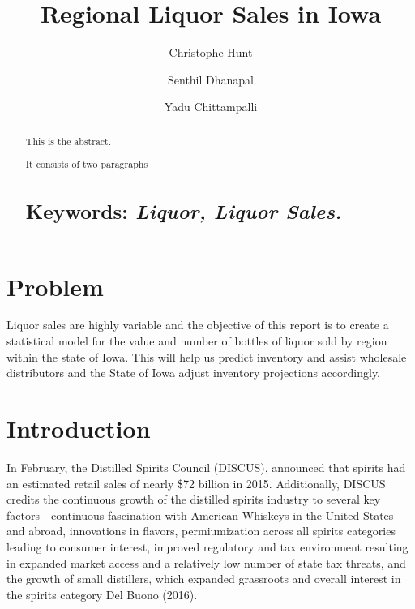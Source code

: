 \documentclass[]{elsarticle} %
\begin{document}
\begin{frontmatter}

  \title{Regional Liquor Sales in Iowa}
    \author[CUNY School of Professional Studies]{Christophe Hunt}
    \author[CUNY School of Professional Studies]{Senthil Dhanapal}
  
    \author[CUNY School of Professional Studies]{Yadu Chittampalli}
  
      \address[CUNY School of Professional Studies]{CUNY School of Professional Studies, Data Analytics, New York, NY}
  
  \begin{abstract}
  This is the abstract.
  
  It consists of two paragraphs
  
  \section{\texorpdfstring{Keywords: \emph{Liquor, Liquor
  Sales.}}{Keywords: Liquor, Liquor Sales.}}\label{keywords-liquor-liquor-sales.}
  \end{abstract}
  
 \end{frontmatter}

\section{Problem}\label{problem}

Liquor sales are highly variable and the objective of this report is to
create a statistical model for the value and number of bottles of liquor
sold by region within the state of Iowa. This will help us predict
inventory and assist wholesale distributors and the State of Iowa adjust
inventory projections accordingly.

\section{Introduction}\label{introduction}

In February, the Distilled Spirits Council (DISCUS), announced that
spirits had an estimated retail sales of nearly \$72 billion in 2015.
Additionally, DISCUS credits the continuous growth of the distilled
spirits industry to several key factors - continuous fascination with
American Whiskeys in the United States and abroad, innovations in
flavors, permiumization across all spirits categories leading to
consumer interest, improved regulatory and tax environment resulting in
expanded market access and a relatively low number of state tax threats,
and the growth of small distillers, which expanded grassroots and
overall interest in the spirits category Del Buono (2016).
\end{document}
